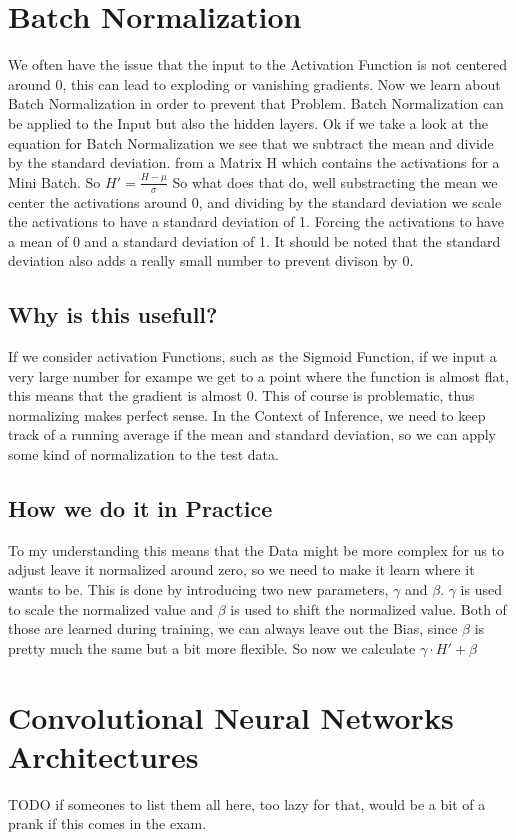 \documentclass[a4paper]{article}
\begin{document}
\section{Batch Normalization}
We often have the issue that the input to the Activation Function is not centered around 0, this can lead to exploding or vanishing gradients. Now we learn about Batch Normalization in order to prevent that Problem. Batch Normalization can be applied to the Input but also the hidden layers. Ok if we take a look at the equation for Batch Normalization we see that we subtract the mean and divide by the standard deviation.
from a Matrix H which contains the activations for a Mini Batch. So $H' = \frac{H - \mu}{\sigma}$ So what does that do, well substracting the mean we center the activations around 0, and dividing by the standard deviation we scale the activations to have a standard deviation of 1. Forcing the activations to have a mean of 0 and a standard deviation of 1. It should be noted that the standard deviation also adds a really small number to prevent divison by 0. 

\subsection{Why is this usefull?}
If we consider activation Functions, such as the Sigmoid Function, if we input a very large number for exampe we get to a point where the function is almost flat, this means that the gradient is almost 0. This of course is problematic, thus normalizing makes perfect sense. In the Context of Inference, we need to keep track of a running average if the mean and standard deviation, 
so we can apply some kind of normalization to the test data.

\subsection{How we do it in Practice}
To my understanding this means that the Data might be more complex for us to adjust leave it normalized around zero, so we need to make it learn where it wants to be. This is done by introducing two new parameters, $\gamma$ and $\beta$. $\gamma$ is used to scale the normalized value and $\beta$ is used to shift the normalized value. Both of those are learned during training, we can always leave out the Bias, since $
\beta$ is pretty much the same but a bit more flexible. So now we calculate $\gamma \cdot H' + \beta$

\section{Convolutional Neural Networks Architectures}
TODO if someones to list them all here, too lazy for that, would be a bit of a prank if this comes in the exam.
\end{document}
